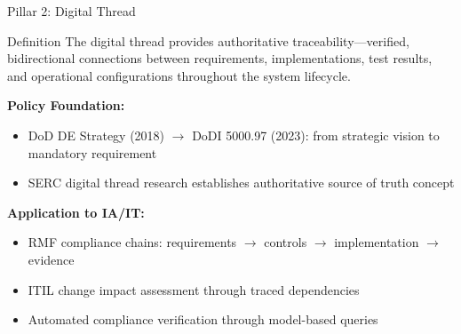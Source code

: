 \documentclass{beamer}
\begin{document}
\begin{frame}[allowframebreaks]{Pillar 2: Digital Thread}
  \begin{small}
    \begin{block}{Definition}
      The digital thread provides authoritative traceability---verified, bidirectional connections between requirements, implementations, test results, and operational configurations throughout the system lifecycle.
    \end{block}

    \textbf{Policy Foundation:}
    \begin{itemize}
      \item DoD DE Strategy (2018) \(\rightarrow\) DoDI 5000.97 (2023): from strategic vision to mandatory requirement
      \item SERC digital thread research establishes authoritative source of truth concept
    \end{itemize}

    \textbf{Application to IA/IT:}
    \begin{itemize}
      \item RMF compliance chains: requirements \(\rightarrow\) controls \(\rightarrow\) implementation \(\rightarrow\) evidence
      \item ITIL change impact assessment through traced dependencies
      \item Automated compliance verification through model-based queries
    \end{itemize}
  \end{small}
\end{frame}
\end{document}
